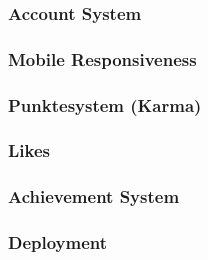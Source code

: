 \subsubsection*{Account System}
\subsubsection*{Mobile Responsiveness}
\subsubsection*{Punktesystem (Karma)}
\subsubsection*{Likes}
\subsubsection*{Achievement System}
\subsubsection*{Deployment}







